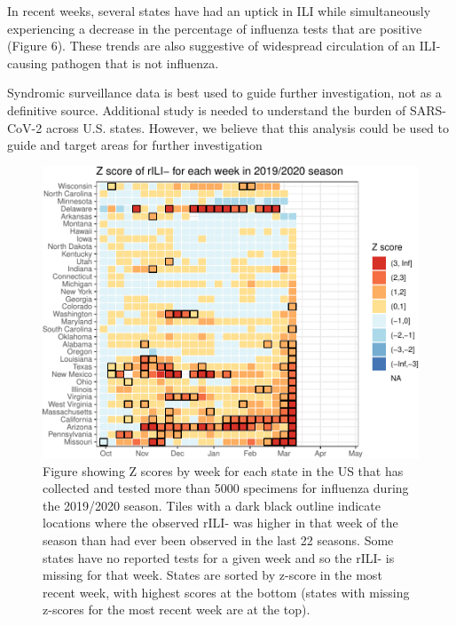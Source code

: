\documentclass[]{article}
\begin{document}
In recent weeks, several states have had an uptick in ILI while
simultaneously experiencing a decrease in the percentage of influenza
tests that are positive (Figure 6). These trends are also suggestive of
widespread circulation of an ILI-causing pathogen that is not influenza.

Syndromic surveillance data is best used to guide further investigation,
not as a definitive source. Additional study is needed to understand the
burden of SARS-CoV-2 across U.S. states. However, we believe that this
analysis could be used to guide and target areas for further
investigation

\begin{figure}
\centering
\includegraphics{ili-labtest-report_files/figure-latex/calc-avg-sd-all-states-1.pdf}
\caption{Figure showing Z scores by week for each state in the US that
has collected and tested more than 5000 specimens for influenza during
the 2019/2020 season. Tiles with a dark black outline indicate locations
where the observed rILI- was higher in that week of the season than had
ever been observed in the last 22 seasons. Some states have no reported
tests for a given week and so the rILI- is missing for that week. States
are sorted by z-score in the most recent week, with highest scores at
the bottom (states with missing z-scores for the most recent week are at
the top).}
\end{figure}
\end{document}
